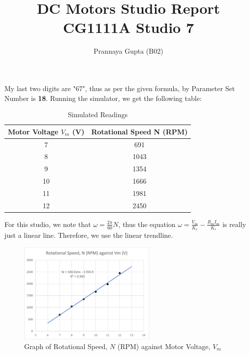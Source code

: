 \documentclass[a4paper,12pt,oneside, tikz]{book}
\title{\textbf{DC Motors} Studio Report \\ CG1111A Studio 7}
\author{Prannaya Gupta (B02)}
\begin{document}
\maketitle

\chapter{}

My last two digits are "67", thus as per the given formula, by Parameter Set Number is \textbf{18}. Running the simulator, we get the following table:

\begin{table}[H]
    \centering
    \begin{tabular}{|c|c|}
         \hline Motor Voltage $V_m$ (V) & Rotational Speed N (RPM)  \\
         \hline 7 & 691 \\
         8 & 1043 \\
         9 & 1354 \\
         10 & 1666 \\
         11 & 1981 \\
         12 & 2450 \\
         \hline
    \end{tabular}
    \caption{Simulated Readings}
    \label{tab:activity1}
\end{table}

For this studio, we note that $\omega = \frac{2\pi}{60}N$, thus the equation $\omega = \frac{V_m}{K_e} - \frac{R_mI_m}{K_e}$ is really just a linear line. Therefore, we use the linear trendline.

\begin{figure}[H]
    \centering
    \includegraphics[width=0.6\textwidth]{images/activity1graph.png}
    \caption{Graph of Rotational Speed, $N$ (RPM) against Motor Voltage, $V_m$}
    \label{fig:activity1graph}
\end{figure}
\end{document}
